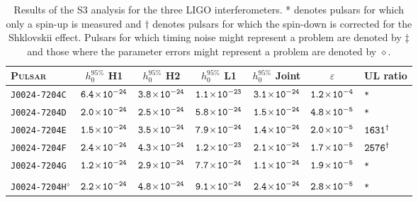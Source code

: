\begin{longtable}{ l | c | c | c | c | c | l }
\caption[Results of the S3 analysis for the three LIGO interferometers.]{\label{S3Results} Results
of the S3 analysis for the three LIGO interferometers. * denotes pulsars for which only a spin-up is
measured and $\dagger$ denotes pulsars for which the spin-down is corrected for the Shklovskii
effect. Pulsars for which timing noise might represent a problem are denoted by $\ddagger$ and those
where the parameter errors might represent a problem are denoted by $\diamond$.} \\
\footnotesize{P\textsc{ulsar}} & \footnotesize{$h_0^{95\%}$ H1} & \footnotesize{$h_0^{95\%}$ H2} &
\footnotesize{$h_0^{95\%}$ L1} & \footnotesize{$h_0^{95\%}$ Joint} & \footnotesize{$\varepsilon$} &
\footnotesize{UL ratio} \\ 
\hline \hline 
\scriptsize{\tt{J0024-7204C}} & \scriptsize{$\tt{6.4\!\times\!10^{-24}}$} & \scriptsize{$\tt{3.8\!\times\!10^{-24}}$} &
\scriptsize{$\tt{1.1\!\times\!10^{-23}}$} & \scriptsize{$\tt{3.1\!\times\!10^{-24}}$} & \scriptsize{$\tt{1.2\!\times\!10^{-4}}$} &
\scriptsize{\tt{*}} \\[-16pt] 
\scriptsize{\tt{J0024-7204D}} & \scriptsize{$\tt{2.0\!\times\!10^{-24}}$} & \scriptsize{$\tt{2.5\!\times\!10^{-24}}$} &
\scriptsize{$\tt{5.8\!\times\!10^{-24}}$} & \scriptsize{$\tt{1.5\!\times\!10^{-24}}$} & \scriptsize{$\tt{4.8\!\times\!10^{-5}}$} &
\scriptsize{\tt{*}} \\[-16pt] 
\scriptsize{\tt{J0024-7204E}} & \scriptsize{$\tt{1.5\!\times\!10^{-24}}$} & \scriptsize{$\tt{3.5\!\times\!10^{-24}}$} &
\scriptsize{$\tt{7.9\!\times\!10^{-24}}$} & \scriptsize{$\tt{1.4\!\times\!10^{-24}}$} & \scriptsize{$\tt{2.0\!\times\!10^{-5}}$} &
\scriptsize{$\tt{1631^{\dagger}}$} \\[-16pt] 
\scriptsize{\tt{J0024-7204F}} & \scriptsize{$\tt{2.4\!\times\!10^{-24}}$} & \scriptsize{$\tt{4.3\!\times\!10^{-24}}$} &
\scriptsize{$\tt{1.2\!\times\!10^{-23}}$} & \scriptsize{$\tt{2.1\!\times\!10^{-24}}$} & \scriptsize{$\tt{1.7\!\times\!10^{-5}}$} &
\scriptsize{$\tt{2576^{\dagger}}$} \\[-16pt] 
\scriptsize{\tt{J0024-7204G}} & \scriptsize{$\tt{1.2\!\times\!10^{-24}}$} & \scriptsize{$\tt{2.9\!\times\!10^{-24}}$} &
\scriptsize{$\tt{7.7\!\times\!10^{-24}}$} & \scriptsize{$\tt{1.1\!\times\!10^{-24}}$} & \scriptsize{$\tt{1.9\!\times\!10^{-5}}$} &
\scriptsize{\tt{*}} \\[-16pt] 
\\[-20pt] 
\scriptsize{\tt{J0024-7204H}$^{\diamond}$} & \scriptsize{$\tt{2.2\!\times\!10^{-24}}$} &
\scriptsize{$\tt{4.8\!\times\!10^{-24}}$} & \scriptsize{$\tt{9.1\!\times\!10^{-24}}$} & \scriptsize{$\tt{2.4\!\times\!10^{-24}}$}
& \scriptsize{$\tt{2.8\!\times\!10^{-5}}$} & \scriptsize{\tt{*}} \\[-16pt] 

\end{longtable}
